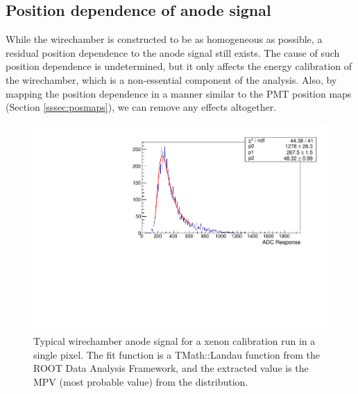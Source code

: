 \subsection{Position dependence of anode signal}

While the wirechamber is constructed to be as homogeneous as possible, a residual
position dependence to the anode signal still exists. The cause of such position dependence is undetermined,
but it only affects the energy calibration of the wirechamber, which is
a non-essential component of the analysis. Also, by mapping the position dependence in a manner
similar to the PMT position maps (Section \ref{sssec:posmaps}), we can remove any effects altogether.

\begin{figure}[h]
  \centering
  \includegraphics[scale=0.5,page=1]{4-UCNACalibrations/MWPCPositionMapSpectrum.pdf}
  \caption{Typical wirechamber anode signal for a xenon calibration run in a
    single pixel. The fit function is a TMath::Landau function from the ROOT Data Analysis
    Framework, and the extracted value is the MPV (most probable value) from the
    distribution.}
  \label{fig:xenonMWPCsignal}
\end{figure}


